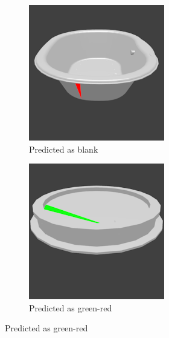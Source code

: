 \begin{figure}
	\centering
	\begin{subfigure}{.3\textwidth}
		\centering
		\includegraphics[width=.8\textwidth]{images/bathtub_0117_2_006.png}
		\caption{Predicted as blank}
		\label{fig:small-features-a}
	\end{subfigure}
	\begin{subfigure}{.3\textwidth}
		\centering
		\includegraphics[width=.8\textwidth]{images/bathtub_0127_1_007.png}
		\caption{Predicted as green-red}
		\label{fig:small-features-b}
	\end{subfigure}

\end{figure}
